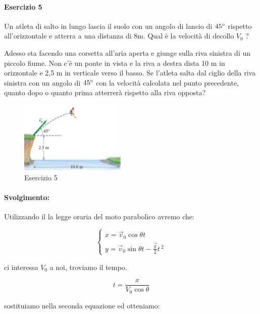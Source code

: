 \paragraph{Esercizio 5}
Un atleta di salto in lungo lascia il suolo con un angolo di lancio di $45^\circ$ rispetto all’orizzontale e atterra a una distanza di 8m. Qual è la velocità di decollo $V_0$ ? 

Adesso sta facendo una corsetta all’aria aperta e giunge sulla riva sinistra di un piccolo fiume. Non c’è un ponte in vista e la riva a destra dista 10 m in orizzontale e 2,5 m in verticale verso il basso. Se l’atleta salta dal ciglio della riva sinistra con un angolo di $45^\circ$ con la velocità calcolata nel punto precedente, quanto dopo o quanto prima atterrerà rispetto alla riva opposta?

\begin{figure}[tb]
\centering
\includegraphics[width=0.45\textwidth]{image/salto}
\caption{Esercizio 5}
\label{img:salto}
\end{figure}




\paragraph{Svolgimento:}

Utilizzando il la legge oraria del moto parabolico avremo che:

$$
\begin{cases}

     x = \vec{v}_0\cos{\theta}t\\
     y = \vec{v}_0\sin{\theta}t-\frac{\vec{g}}{2}t\,^2
     
\end{cases}
$$

ci interessa $V_0$ a noi, troviamo il tempo.

\begin{equation*}
    t=\frac{x}{V_0\cos{\theta}}
\end{equation*}

sostituiamo nella seconda equazione ed otteniamo:


